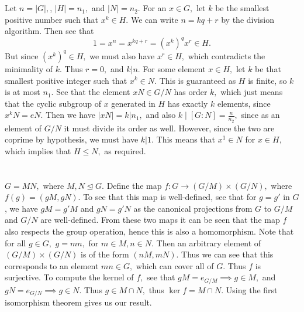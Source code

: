 \documentclass{article}
\begin{document}
\section{} %
Let $n=|G|,$, $|H| =n_1,$ and $|N| = n_2.$ For an $x \in G,$ let $k$ be the smallest positive number such that $x^k \in H.$ We can write $n=kq+r$ by the 
division algorithm. Then see that $$1=x^{n}=x^{kq+r}=(x^k)^qx^r \in H.$$ But since $(x^k)^q \in H,$ we must also have $x^r \in H,$ which contradicts the 
minimality of $k.$ Thus $r=0,$ and $k|n.$ 
For some element $x \in H,$ let $k$ be that smallest positive integer such that $x^k \in N.$ This is guaranteed as $H$ is finite, so $k$ is at most $n_1.$ 
See that the element $xN \in G/N$ has order $k,$ which just means that the cyclic subgroup of $x$ generated in $H$ has exactly $k$ elements, since 
$x^kN=eN.$ Then we have $|xN| = k| n_1,$ and also $k \mid [G:N] =\frac{n}{n_2},$ since as an element of $G/N$ it must divide its order as well. However, 
since the two are coprime by hypothesis, we must have $k|1.$ This means that $x^1 \in N$ for $x \in H,$ which implies that $H \leq N,$ as required. 
\section{} %
$G=MN,$ where $M,N \trianglelefteq G.$ Define the map $f: G \rightarrow (G/M) \times (G/N),$ where $f(g)=(gM,gN).$ To see that this map is well-defined, see 
that for $g=g'$ in $G$, we have $gM=g'M$ and $gN=g'N$ as the canonical projections from $G$ to $G/M$ and $G/N$ are well-defined. From these two maps it can 
be seen that the map $f$ also respects the group operation, hence this is also a homomorphism. Note that for all $g \in G,$ $g=mn,$ for $m \in M, n \in N.$ 
Then an arbitrary element of $(G/M) \times (G/N)$ is of the form $(nM,mN).$ Thus we can see that this corresponds to an element $mn \in G,$ which can cover 
all of $G.$ Thus $f$ is surjective. To compute the kernel of $f,$ see that $gM=e_{G/M} \implies g \in M,$ and $gN=e_{G/N} \implies g \in N$. Thus $g \in M 
\cap N,$ thus $\ker f=M \cap N.$ Using the first isomorphism theorem gives us our result. 
\end{document}
